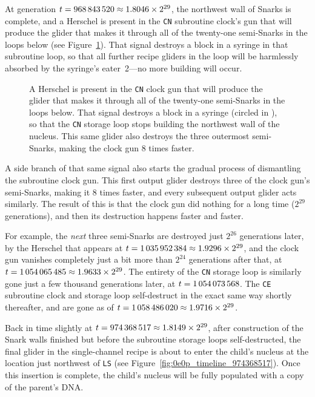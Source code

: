 At generation $t = 968{\,}843{\,}520 \approx 1.8046 \times 2^{29}$, the northwest wall of Snarks is complete, and a Herschel is present in the \texttt{CN} subroutine clock's gun that will produce the glider that makes it through all of the twenty-one semi-Snarks in the loops below (see Figure~\ref{fig:0e0p_timeline_968843520}). That signal destroys a block in a syringe in that subroutine loop, so that all further recipe gliders in the loop will be harmlessly absorbed by the syringe's eater~2---no more building will occur.

\begin{figure}[!htb]
	\centering
	\caption{A Herschel is present in the \texttt{CN} clock gun that will produce the glider that makes it through all of the twenty-one semi-Snarks in the loops below. That signal destroys a block in a syringe (circled in ), so that the \texttt{CN} storage loop stops building the northwest wall of the nucleus. This same glider also destroys the three outermost semi-Snarks, making the clock gun $8$ times faster.}
	\label{fig:0e0p_timeline_968843520}
\end{figure}

A side branch of that same signal also starts the gradual process of dismantling the subroutine clock gun. This first output glider destroys three of the clock gun's semi-Snarks, making it 8 times faster, and every subsequent output glider acts similarly. The result of this is that the clock gun did nothing for a long time ($2^{29}$ generations), and then its destruction happens faster and faster.

For example, the \emph{next} three semi-Snarks are destroyed just $2^{26}$ generations later, by the Herschel that appears at $t = 1{\,}035{\,}952{\,}384 \approx 1.9296 \times 2^{29}$, and the clock gun vanishes completely just a bit more than $2^{24}$ generations after that, at $t = 1{\,}054{\,}065{\,}485 \approx 1.9633 \times 2^{29}$. The entirety of the \texttt{CN} storage loop is similarly gone just a few thousand generations later, at $t = 1{\,}054{\,}073{\,}568$. The \texttt{CE} subroutine clock and storage loop self-destruct in the exact same way shortly thereafter, and are gone as of $t = 1{\,}058{\,}486{\,}020 \approx 1.9716 \times 2^{29}$.

Back in time slightly at $t = 974{\,}368{\,}517 \approx 1.8149 \times 2^{29}$, after construction of the Snark walls finished but before the subroutine storage loops self-destructed, the final glider in the single-channel recipe is about to enter the child's nucleus at the location just northwest of \texttt{LS} (see Figure~\ref{fig:0e0p_timeline_974368517}). Once this insertion is complete, the child's nucleus will be fully populated with a copy of the parent's DNA.

